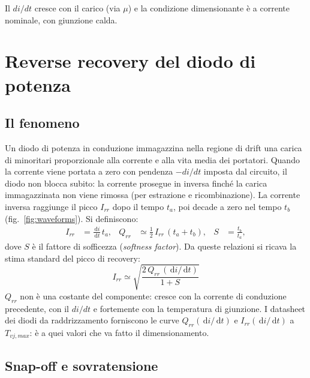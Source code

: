 \documentclass[11pt,a4paper]{article}
\newcommand{\ud}{\,\mathrm{d}}
\begin{document}
Il $di/dt$ cresce con il carico (via $\mu$) e la condizione dimensionante
\`e a corrente nominale, con giunzione calda.

\section{Reverse recovery del diodo di potenza}
\label{sec:rr}

\subsection{Il fenomeno}

Un diodo di potenza in conduzione immagazzina nella regione di drift una
carica di minoritari proporzionale alla corrente e alla vita media dei
portatori. Quando la corrente viene portata a zero con pendenza $-di/dt$
imposta dal circuito, il diodo non blocca subito: la corrente prosegue in
inversa finch\'e la carica immagazzinata non viene rimossa (per
estrazione e ricombinazione). La corrente inversa raggiunge il picco
$I_{rr}$ dopo il tempo $t_a$, poi decade a zero nel tempo $t_b$
(fig.~\ref{fig:waveforms}). Si definiscono:
\begin{align}
I_{rr} &= \frac{\ud i}{\ud t}\, t_a, &
Q_{rr} &\simeq \tfrac{1}{2}\, I_{rr}\,(t_a+t_b), &
S &= \frac{t_b}{t_a},
\end{align}
dove $S$ \`e il fattore di soffice\-zza (\emph{softness factor}). Da queste
relazioni si ricava la stima standard del picco di recovery:
\begin{equation}
\boxed{\;
I_{rr} \simeq \sqrt{\frac{2\,Q_{rr}\,(\ud i/\ud t)}{1+S}}
\;}
\label{eq:Irr}
\end{equation}
$Q_{rr}$ non \`e una costante del componente: cresce con la corrente di
conduzione precedente, con il $di/dt$ e fortemente con la temperatura di
giunzione. I datasheet dei diodi da raddrizzamento forniscono le curve
$Q_{rr}(\ud i/\ud t)$ e $I_{rr}(\ud i/\ud t)$ a $T_{vj,max}$: \`e a quei
valori che va fatto il dimensionamento.

\subsection{Snap-off e sovratensione}
\end{document}
